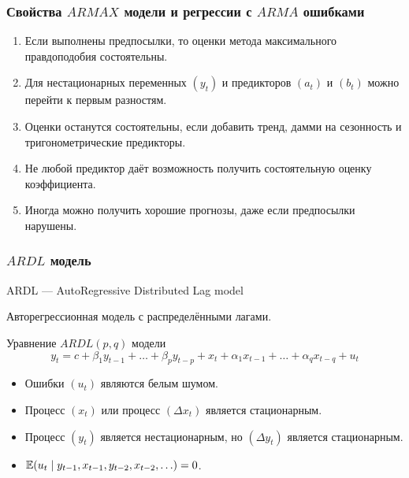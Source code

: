 \begin{frame}
  \frametitle{Свойства $ARMAX$ модели и регрессии с $ARMA$ ошибками}

  \begin{enumerate}
    \item Если выполнены предпосылки, то оценки метода максимального правдоподобия \alert{состоятельны}.
    \item Для нестационарных переменных $(y_t)$ и предикторов $(a_t)$ и $(b_t)$ можно перейти к первым \alert{разностям}. 
    \item Оценки \alert{останутся} состоятельны, если добавить тренд, дамми на сезонность и тригонометрические предикторы.
    \item \alert{Не любой} предиктор даёт возможность получить состоятельную оценку коэффициента. 
    \item \alert{Иногда} можно получить хорошие прогнозы, даже если предпосылки нарушены.
  \end{enumerate}
  
\end{frame}



\begin{frame}
  \frametitle{$ARDL$ модель}
  
  \alert{ARDL} — \alert{A}uto\alert{R}egressive \alert{D}istributed \alert{L}ag model

  Авторегрессионная модель с распределёнными лагами.

  \begin{block}{Уравнение $ARDL(p, q)$ модели}
    \[
      y_t = c + \beta_1 y_{t-1} + \ldots + \beta_p y_{t-p} + x_t + \alpha_1 x_{t-1} + \ldots + \alpha_q x_{t-q} + u_t
    \]
  \end{block}
\pause
  \begin{itemize}[<+->]
    \item Ошибки $(u_t)$ являются белым шумом. 
    \item Процесс $(x_t)$ или процесс $(\Delta x_t)$ является стационарным. 
    \item Процесс $(y_t)$ является нестационарным, но $(\Delta y_t)$ является стационарным. 
    \item $\mathbb{E}(u_t \mid y_{t-1}, x_{t-1}, y_{t-2}, x_{t-2}, \ldots) = 0$.
  \end{itemize}

\end{frame}


